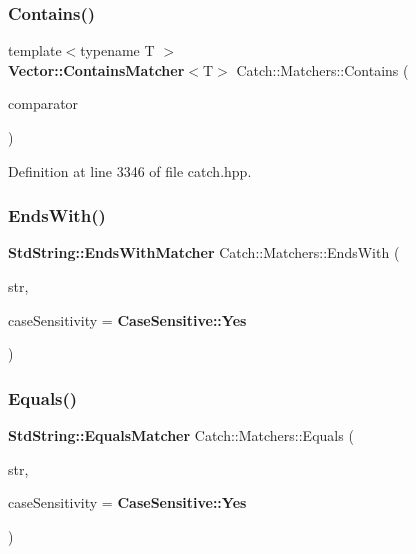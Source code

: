 \mbox{\label{namespace_catch_1_1_matchers_a4b3621740dc515216ad31ab827d4092c}} 
\subsubsection{Contains()\hspace{0.1cm}{\footnotesize\ttfamily [2/2]}}
{\footnotesize\ttfamily template$<$typename T $>$ \\
\textbf{ Vector\+::\+Contains\+Matcher}$<$T$>$ Catch\+::\+Matchers\+::\+Contains (\begin{DoxyParamCaption}\item[{std\+::vector$<$ T $>$ const \&}]{comparator }\end{DoxyParamCaption})}



Definition at line 3346 of file catch.\+hpp.

\mbox{\label{namespace_catch_1_1_matchers_ae5a45efb4538c57c43e04f3f9043ad6e}} 
\subsubsection{EndsWith()}
{\footnotesize\ttfamily \textbf{ Std\+String\+::\+Ends\+With\+Matcher} Catch\+::\+Matchers\+::\+Ends\+With (\begin{DoxyParamCaption}\item[{std\+::string const \&}]{str,  }\item[{\textbf{ Case\+Sensitive\+::\+Choice}}]{case\+Sensitivity = {\ttfamily \textbf{ Case\+Sensitive\+::\+Yes}} }\end{DoxyParamCaption})}

\mbox{\label{namespace_catch_1_1_matchers_af8af7dfc338335ed4c788cb1b37fc59f}} 
\subsubsection{Equals()\hspace{0.1cm}{\footnotesize\ttfamily [1/2]}}
{\footnotesize\ttfamily \textbf{ Std\+String\+::\+Equals\+Matcher} Catch\+::\+Matchers\+::\+Equals (\begin{DoxyParamCaption}\item[{std\+::string const \&}]{str,  }\item[{\textbf{ Case\+Sensitive\+::\+Choice}}]{case\+Sensitivity = {\ttfamily \textbf{ Case\+Sensitive\+::\+Yes}} }\end{DoxyParamCaption})}

